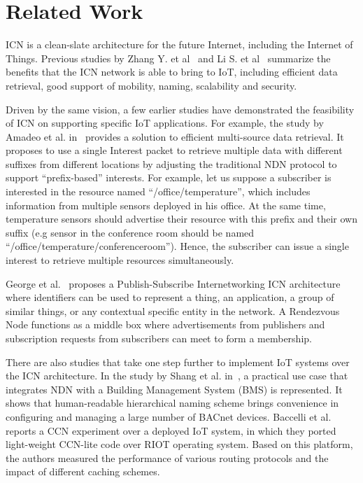 \section{Related Work}
\label{sec:related}

ICN is a clean-slate architecture for the future Internet, including the Internet of Things. Previous studies by Zhang Y. et al~\cite{zhang2013icn} and Li S. et al~\cite{li2014comparative} summarize the benefits that the ICN network is able to bring to IoT, including efficient data retrieval, good support of mobility, naming, scalability and security.


Driven by the same vision, a few earlier studies have demonstrated the feasibility of ICN on supporting specific IoT applications. For example, the study by Amadeo et al. in~\cite{amadeo2014multi} provides a solution to efficient multi-source data retrieval. It proposes to use a single Interest packet to retrieve multiple data with different suffixes from different locations by adjusting the traditional NDN protocol to support ``prefix-based'' interests. For example, let us suppose a subscriber is interested in the resource named ``/office/temperature'', which includes  information from multiple sensors deployed in his office. At the same time, temperature sensors should advertise their resource with this prefix and their own suffix (e.g sensor in the conference room should be named ``/office/temperature/conferenceroom''). Hence, the subscriber can issue a single interest to retrieve multiple resources simultaneously.


George et al.~\cite{polyzos2015building} proposes a Publish-Subscribe Internetworking ICN architecture
where identifiers can be used to represent a thing, an application, a group of similar things, or any contextual specific entity in the network. A Rendezvous Node functions as a middle box where advertisements from publishers and subscription requests from subscribers can meet to form a membership.


There are also studies that take one step further to implement IoT systems over the ICN architecture. In the study by Shang et al. in~\cite{shang2014securing}, a practical use case that integrates NDN with a Building Management System (BMS) is represented. It shows that human-readable hierarchical naming scheme brings convenience in configuring and managing a large number of BACnet devices. Baccelli et al.~\cite{baccelli2014information} reports a CCN experiment  over a deployed IoT system, in which they ported light-weight CCN-lite code over RIOT operating system. Based on this platform, the authors measured the performance of various routing protocols and the impact of different caching schemes.

